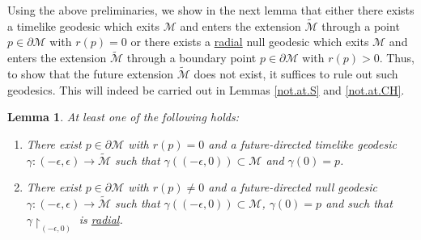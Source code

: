 \documentclass[10pt, reqno]{amsart}
\newtheorem{lemma}[theorem]{Lemma}
\theoremstyle{definition}
\theoremstyle{remark}
\numberwithin{equation}{section}
\newcommand{\rd}{\partial}
\newcommand{\0}{\emptyset}
\begin{document}
Using the above preliminaries, we show in the next lemma that either there exists a timelike geodesic which exits $\mathcal M$ and enters the extension $\widetilde{\mathcal M}$ through a point $p\in \rd\mathcal M$ with $r(p)=0$ or there exists a \underline{radial} null geodesic which exits $\mathcal M$ and enters the extension $\widetilde{\mathcal M}$ through a boundary point $p\in \rd\mathcal M$ with $r(p)>0$. Thus, to show that the future extension $\widetilde{\mathcal M}$ does not exist, it suffices to rule out such geodesics. This will indeed be carried out in Lemmas \ref{not.at.S} and \ref{not.at.CH}.
\begin{lemma}\label{inextendibility.main.step}
At least one of the following holds:
\begin{enumerate}
\item There exist $p\in \rd\mathcal M$ with $r(p)=0$ and a future-directed timelike geodesic $\gamma:(-\epsilon,\epsilon)\to \widetilde{\mathcal M}$ such that $\gamma((-\epsilon,0))\subset \mathcal M$ and $\gamma(0)=p$.
\item There exist $p\in \rd\mathcal M$ with $r(p)\neq 0$ and a future-directed null geodesic $\gamma:(-\epsilon,\epsilon)\to \widetilde{\mathcal M}$ such that $\gamma((-\epsilon,0))\subset \mathcal M$, $\gamma(0)=p$ and such that $\gamma\restriction_{(-\epsilon,0)}$ is \underline{radial}.
\end{enumerate}
\end{lemma}
\end{document}
